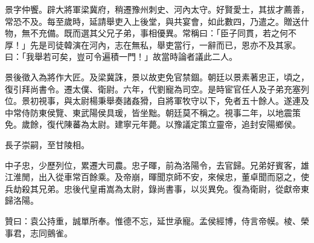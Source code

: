 \begin{pinyinscope}
景字仲饗。辟大將軍梁冀府，稍遷豫州刺史、河內太守。好賢愛士，其拔才薦善，常恐不及。每至歲時，延請舉吏入上後堂，與共宴會，如此數四，乃遣之。贈送什物，無不充備。既而選其父兄子弟，事相優異。常稱曰：「臣子同貫，若之何不厚！」先是司徒韓演在河內，志在無私，舉吏當行，一辭而已，恩亦不及其家。曰：「我舉若可矣，豈可令遍積一門！」故當時論者議此二人。

景後徵入為將作大匠。及梁冀誅，景以故吏免官禁錮。朝廷以景素著忠正，頃之，復引拜尚書令。遷太僕、衛尉。六年，代劉寵為司空。是時宦官任人及子弟充塞列位。景初視事，與太尉楊秉舉奏諸姦猾，自將軍牧守以下，免者五十餘人。遂連及中常侍防東侯覽、東武陽侯具瑗，皆坐黜。朝廷莫不稱之。視事二年，以地震策免。歲餘，復代陳蕃為太尉。建寧元年薨。以豫議定策立靈帝，追封安陽鄉侯。

長子崇嗣，至甘陵相。

中子忠，少歷列位，累遷大司農。忠子暉，前為洛陽令，去官歸。兄弟好賓客，雄江淮閒，出入從車常百餘乘。及帝崩，暉聞京師不安，來候忠，董卓聞而惡之，使兵劫殺其兄弟。忠後代皇甫嵩為太尉，錄尚書事，以災異免。復為衛尉，從獻帝東歸洛陽。

贊曰：袁公持重，誠單所奉。惟德不忘，延世承寵。孟侯經博，侍言帝幙。棱、榮事君，志同鸇雀。


\end{pinyinscope}
